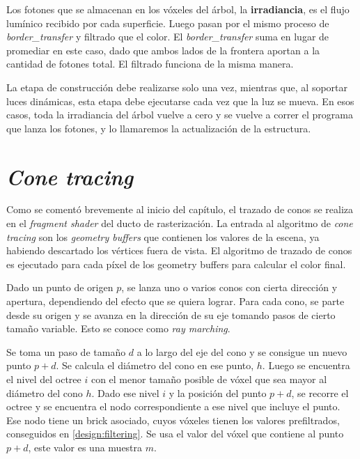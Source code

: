 Los fotones que se almacenan en los vóxeles del árbol, la \textbf{irradiancia}, es el flujo lumínico recibido por cada superficie.
Luego pasan por el mismo proceso de \textit{border\_transfer} y filtrado que el color.
El \textit{border\_transfer} suma en lugar de promediar en este caso, dado que ambos lados de la frontera aportan a la cantidad de fotones total.
El filtrado funciona de la misma manera.

La etapa de construcción debe realizarse solo una vez, mientras que, al soportar luces dinámicas, esta etapa debe ejecutarse cada vez que la luz se mueva.
En esos casos, toda la irradiancia del árbol vuelve a cero y se vuelve a correr el programa que lanza los fotones, y lo llamaremos la actualización de la estructura.


\section{\textit{Cone tracing}}\label{sec:cone_tracing}

Como se comentó brevemente al inicio del capítulo, el trazado de conos se realiza en el \textit{fragment shader} del ducto de rasterización.
La entrada al algoritmo de \textit{cone tracing} son los \textit{geometry buffers} que contienen los valores de la escena, ya habiendo descartado los vértices fuera de vista.
El algoritmo de trazado de conos es ejecutado para cada píxel de los geometry buffers para calcular el color final.

Dado un punto de origen $p$, se lanza uno o varios conos con cierta dirección y apertura, dependiendo del efecto que se quiera lograr.
Para cada cono, se parte desde su origen y se avanza en la dirección de su eje tomando pasos de cierto tamaño variable.
Esto se conoce como \textit{ray marching}. %

Se toma un paso de tamaño $d$ a lo largo del eje del cono y se consigue un nuevo punto $p + d$.
Se calcula el diámetro del cono en ese punto, $h$.
Luego se encuentra el nivel del octree $i$ con el menor tamaño posible de vóxel que sea mayor al diámetro del cono $h$.
Dado ese nivel $i$ y la posición del punto $p + d$, se recorre el octree y se encuentra el nodo correspondiente a ese nivel que incluye el punto.
Ese nodo tiene un brick asociado, cuyos vóxeles tienen los valores prefiltrados, conseguidos en \ref{design:filtering}.
Se usa el valor del vóxel que contiene al punto $p + d$, este valor es una muestra $m$.

